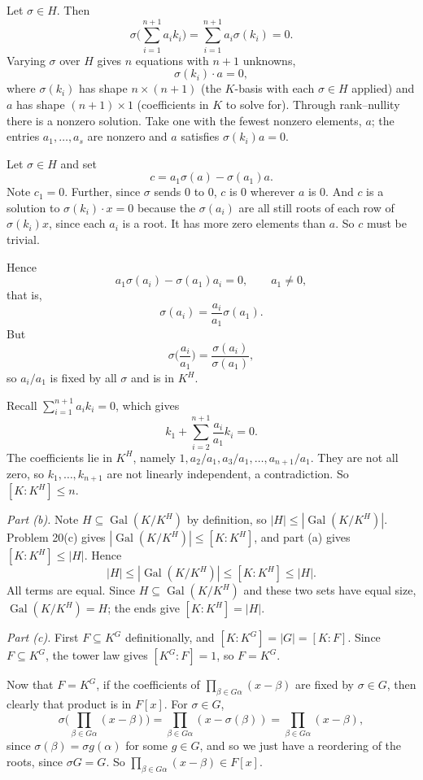 \documentclass[11pt]{article}
\begin{document}
Let $\sigma\in H$. Then
\[
\sigma\Big(\sum_{i=1}^{n+1}a_ik_i\Big)=\sum_{i=1}^{n+1}a_i\sigma(k_i)=0 .
\]
Varying $\sigma$ over $H$ gives $n$ equations with $n+1$ unknowns,
\[
\sigma(k_i)\cdot a=0 ,
\]
where $\sigma(k_i)$ has shape $n\times(n+1)$ (the $K$-basis with each $\sigma\in H$ applied) and $a$ has shape $(n+1)\times1$ (coefficients in $K$ to solve for). Through rank--nullity there is a nonzero solution. Take one with the fewest nonzero elements, $a$; the entries $a_1,\dots,a_s$ are nonzero and $a$ satisfies $\sigma(k_i)a=0$.

Let $\sigma\in H$ and set
\[
c=a_1\sigma(a)-\sigma(a_1)a .
\]
Note $c_1=0$. Further, since $\sigma$ sends $0$ to $0$, $c$ is $0$ wherever $a$ is $0$. And $c$ is a solution to $\sigma(k_i)\cdot x=0$ because the $\sigma(a_i)$ are all still roots of each row of $\sigma(k_i)x$, since each $a_i$ is a root. It has more zero elements than $a$. So $c$ must be trivial.

Hence
\[
a_1\sigma(a_i)-\sigma(a_1)a_i=0,\qquad a_1\neq0,
\]
that is,
\[
\sigma(a_i)=\frac{a_i}{a_1}\sigma(a_1).
\]
But
\[
\sigma\Big(\frac{a_i}{a_1}\Big)=\frac{\sigma(a_i)}{\sigma(a_1)},
\]
so $a_i/a_1$ is fixed by all $\sigma$ and is in $K^H$.

Recall $\sum_{i=1}^{n+1}a_ik_i=0$, which gives
\[
k_1+\sum_{i=2}^{n+1}\frac{a_i}{a_1}k_i=0 .
\]
The coefficients lie in $K^H$, namely $1,a_2/a_1,a_3/a_1,\dots,a_{n+1}/a_1$. They are not all zero, so $k_1,\dots,k_{n+1}$ are not linearly independent, a contradiction. So $[K:K^H]\le n$.

\emph{Part (b).} Note $H\subseteq\operatorname{Gal}(K/K^H)$ by definition, so $|H|\le|\operatorname{Gal}(K/K^H)|$. Problem 20(c) gives $|\operatorname{Gal}(K/K^H)|\le[K:K^H]$, and part (a) gives $[K:K^H]\le|H|$. Hence
\[
|H|\le|\operatorname{Gal}(K/K^H)|\le[K:K^H]\le|H| .
\]
All terms are equal. Since $H\subseteq\operatorname{Gal}(K/K^H)$ and these two sets have equal size, $\operatorname{Gal}(K/K^H)=H$; the ends give $[K:K^H]=|H|$.

\emph{Part (c).} First $F\subseteq K^G$ definitionally, and $[K:K^G]=|G|=[K:F]$. Since $F\subseteq K^G$, the tower law gives $[K^G:F]=1$, so $F=K^G$.

Now that $F=K^G$, if the coefficients of $\prod_{\beta\in G\alpha}(x-\beta)$ are fixed by $\sigma\in G$, then clearly that product is in $F[x]$. For $\sigma\in G$,
\[
\sigma\Big(\prod_{\beta\in G\alpha}(x-\beta)\Big)=\prod_{\beta\in G\alpha}(x-\sigma(\beta))=\prod_{\beta\in G\alpha}(x-\beta),
\]
since $\sigma(\beta)=\sigma g(\alpha)$ for some $g\in G$, and so we just have a reordering of the roots, since $\sigma G=G$. So $\prod_{\beta\in G\alpha}(x-\beta)\in F[x]$.
\end{document}
